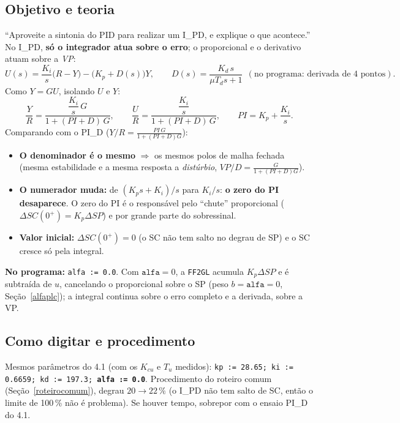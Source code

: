 \subsection{Objetivo e teoria}
``Aproveite a sintonia do PID para realizar um I\_PD, e explique o que acontece.'' No I\_PD, \textbf{só o integrador atua sobre o erro}; o proporcional e o derivativo atuam sobre a \emph{VP}:
\[
U(s)=\frac{K_i}{s}\big(R-Y\big)-\Big(K_p+D(s)\Big)Y,\qquad D(s)=\frac{K_d\,s}{\mu T_ds+1}\ \ (\text{no programa: derivada de 4 pontos}).
\]
Como $Y=GU$, isolando $U$ e $Y$:
\[
\frac{Y}{R}=\frac{\dfrac{K_i}{s}\,G}{1+(PI+D)\,G},\qquad\frac{U}{R}=\frac{\dfrac{K_i}{s}}{1+(PI+D)\,G},\qquad PI=K_p+\frac{K_i}{s}.
\]
Comparando com o PI\_D ($Y/R=\frac{PI\,G}{1+(PI+D)G}$):
\begin{itemize}
\item \textbf{O denominador é o mesmo} $\Rightarrow$ os mesmos polos de malha fechada (mesma estabilidade e a mesma resposta a \emph{distúrbio}, $VP/D=\frac{G}{1+(PI+D)G}$).
\item \textbf{O numerador muda:} de $(K_ps+K_i)/s$ para $K_i/s$: \textbf{o zero do PI desaparece}. O zero do PI é o responsável pelo ``chute'' proporcional ($\Delta SC(0^+)=K_p\Delta SP$) e por grande parte do sobressinal.
\item \textbf{Valor inicial:} $\Delta SC(0^+)=0$ (o SC não tem salto no degrau de SP) e o SC cresce só pela integral.
\end{itemize}
\textbf{No programa:} \texttt{alfa := 0.0}. Com $\mathtt{alfa}=0$, a \texttt{FF2GL} acumula $K_p\Delta SP$ e é subtraída de $u$, cancelando o proporcional sobre o SP (peso $b=\mathtt{alfa}=0$, Seção~\ref{alfaplc}); a integral continua sobre o erro completo e a derivada, sobre a VP.
\subsection{Como digitar e procedimento}
Mesmos parâmetros do 4.1 (com os $K_{cu}$ e $T_u$ medidos): \texttt{kp := 28.65; ki := 0.6659; kd := 197.3; \textbf{alfa := 0.0}}. Procedimento do roteiro comum (Seção~\ref{roteirocomum}), degrau $20\to22\,\%$ (o I\_PD não tem salto de SC, então o limite de 100\,\% não é problema). Se houver tempo, sobrepor com o ensaio PI\_D do 4.1.
